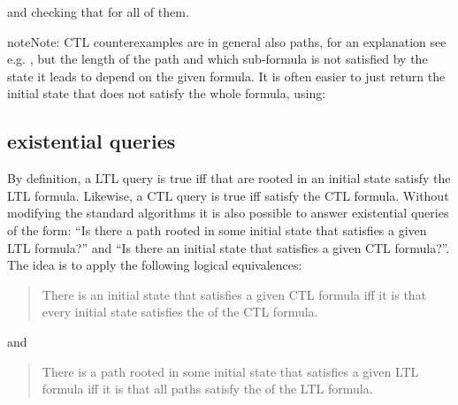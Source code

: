\documentclass[letterpaper,10pt,english]{sphinxmanual}
\begin{document}
and checking that  for all of them.

\begin{sphinxadmonition}{note}{Note:}
CTL counterexamples are in general also paths, for an explanation see e.g. {\hyperref[\detokenize{Bibliography:baier2008}]{}},
but the length of the path and which sub-formula is not satisfied by the state it leads to depend on the given formula.
It is often easier to just return the initial state that does not satisfy the whole formula, using:

\begin{sphinxVerbatim}[commandchars=\\\{\}]
      
  \PYG{p}{[}\PYG{p}{]}
\end{sphinxVerbatim}
\end{sphinxadmonition}


\subsection{existential queries}
\label{\detokenize{Manual:existential-queries}}
By definition, a LTL query is true iff  that are rooted in an initial state satisfy the LTL formula.
Likewise, a CTL query is true iff  satisfy the CTL formula.
Without modifying the standard algorithms it is also possible to answer existential queries of the form:
“Is there a path rooted in some initial state that satisfies a given LTL formula?”
and “Is there an initial state that satisfies a given CTL formula?”.
The idea is to apply the following logical equivalences:
\begin{quote}

There is an initial state that satisfies a given CTL formula iff
it is  that every initial state satisfies the  of the CTL formula.
\end{quote}

and
\begin{quote}

There is a path rooted in some initial state that satisfies a given LTL formula iff
it is  that all paths satisfy the  of the LTL formula.
\end{quote}
\end{document}
